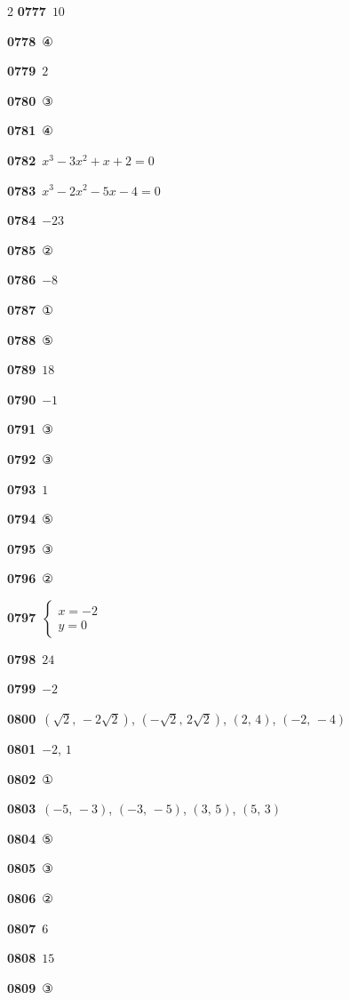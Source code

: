 \documentclass[10pt,a4paper]{article}
\begin{document}
\begin{multicols}{2}
\noindent\textbf{0777}\ $10$\par
\noindent\textbf{0778}\ ④\par
\noindent\textbf{0779}\ $2$\par
\noindent\textbf{0780}\ ③\par
\noindent\textbf{0781}\ ④\par
\noindent\textbf{0782}\ $x^3-3x^2+x+2=0$\par
\noindent\textbf{0783}\ $x^3-2x^2-5x-4=0$\par
\noindent\textbf{0784}\ $-23$\par
\noindent\textbf{0785}\ ②\par
\noindent\textbf{0786}\ $-8$\par
\noindent\textbf{0787}\ ①\par
\noindent\textbf{0788}\ ⑤\par
\noindent\textbf{0789}\ $18$\par
\noindent\textbf{0790}\ $-1$\par
\noindent\textbf{0791}\ ③\par
\noindent\textbf{0792}\ ③\par
\noindent\textbf{0793}\ $1$\par
\noindent\textbf{0794}\ ⑤\par
\noindent\textbf{0795}\ ③\par
\noindent\textbf{0796}\ ②\par
\noindent\textbf{0797}\ $\begin{cases} x=-2 \\ y=0 \end{cases}$\par
\noindent\textbf{0798}\ $24$\par
\noindent\textbf{0799}\ $-2$\par
\noindent\textbf{0800}\ $(\sqrt{2},\,-2\sqrt{2})$, $(-\sqrt{2},\,2\sqrt{2})$, $(2,\,4)$, $(-2,\,-4)$\par
\noindent\textbf{0801}\ $-2$, $1$\par
\noindent\textbf{0802}\ ①\par
\noindent\textbf{0803}\ $(-5,\,-3)$, $(-3,\,-5)$, $(3,\,5)$, $(5,\,3)$\par
\noindent\textbf{0804}\ ⑤\par
\noindent\textbf{0805}\ ③\par
\noindent\textbf{0806}\ ②\par
\noindent\textbf{0807}\ $6$\par
\noindent\textbf{0808}\ $15$\par
\noindent\textbf{0809}\ ③\par

\end{multicols}
\end{document}
